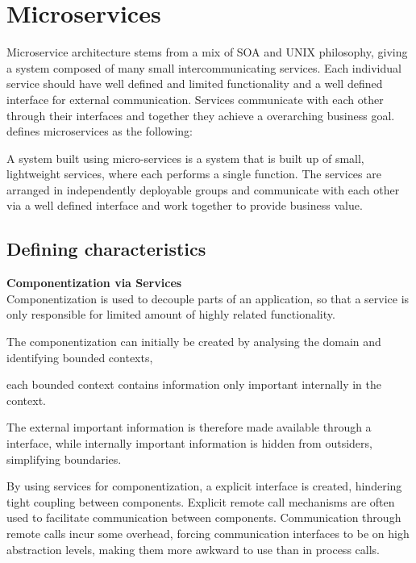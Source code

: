 \section{Microservices}
Microservice architecture stems from a mix of SOA and UNIX philosophy, giving a system composed of many small intercommunicating services. Each individual service should have well defined and limited functionality and a well defined interface for external communication. Services communicate with each other through their interfaces and together they achieve a overarching business goal. \citeauthor{morgantini2013whatAreMicroServices} defines microservices as the following:

\begin{quote_highlight}
A system built using micro-services is a system that is built up of small, lightweight services, where each performs a single function. The services are arranged in independently deployable groups and communicate with each other via a well defined interface and work together to provide business value.\cite{morgantini2013whatAreMicroServices}
\end{quote_highlight}

\subsection{Defining characteristics}
\textbf{Componentization via Services}\\
Componentization is used to decouple parts of an application, so that a service is only responsible for limited amount of highly related functionality\cite{morgantini2013whatAreMicroServices}. 


The componentization can initially be created by analysing the domain and identifying bounded contexts\cite[p.~31]{newman2015microservices}, 


each bounded context contains information only important internally in the context. 



The external important information is therefore made available through a interface, while internally important information is hidden from outsiders, simplifying boundaries.

By using services for componentization, a explicit interface is created, hindering tight coupling between components. Explicit remote call mechanisms are often used to facilitate communication between components. Communication through remote calls incur some overhead, forcing communication interfaces to be on high abstraction levels, making them more awkward to use than in process calls.

